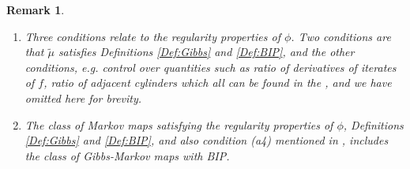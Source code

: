 \documentclass[11pt, reqno]{amsart}
\theoremstyle{plain}%
\newtheorem{remark}[theorem]{Remark}
\newtheorem{lemma}[theorem]{Lemma}
\theoremstyle{definition}
\theoremstyle{definition}
\def\N{\ensuremath{\mathbb N}}
\def\E{\mathbb E}
\def\st{such that }
\def\ulx{\underline{x}}
\numberwithin{equation}{section}
\begin{document}
\begin{remark}\label{Remark:Cond}
\begin{enumerate}
    \item Three conditions relate to the regularity properties of $\phi$. Two conditions are that $\tilde{\mu}$ satisfies Definitions \ref{Def:Gibbs} and \ref{Def:BIP}, and the other conditions, e.g. control over quantities such as ratio of derivatives of iterates of $f$, ratio of adjacent cylinders which all can be found in the \cite{MikeNatali}, and we have omitted here for brevity.
   \item The class of Markov maps satisfying the regularity properties of $\phi$, Definitions \ref{Def:Gibbs} and \ref{Def:BIP}, and also condition (a4) mentioned in \cite[p4]{MikeNatali}, includes the class of Gibbs-Markov maps with BIP.
    \end{enumerate}
\end{remark}



\end{document}
